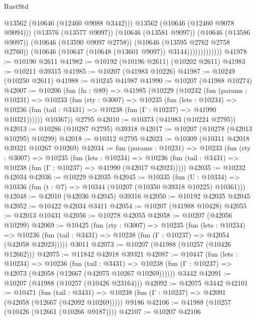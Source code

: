 \begin{lexlean}{RustStd}
\begin{coremodule}
                              @13562
                              (@10646 (@12460 @9088 @3442)))
                            @13562
                            (@10646 (@12460 @9078 @9094)))
                          (@13576 (@13577 @9097))
                          (@10646 (@13581 @9097))
                          (@10646 (@13586 @9097))
                          (@10646 (@13590 @9097 @2758))
                          (@10646 (@13595 @2762 @2758 @2760))
                          (@10646 (@10647 (@10648 (@13601 @9097)) @3144)))))))))))))
@41978 := @10190 @2611
@41982 := @10192 (@10196 @2611) (@10202 @2611)
@41983 := @10211 @39315
@41985 := @10207 (@41983 @10226)
@41987 := @10249 (@10250 @2611)
@41988 := @10245 @41987
@41990 := @10207 (@41988 @10274)
@42007 := @10206
    (fun (fn : @89) =>
    @41985
      (@10229
        (@10232
          (fun (params : @10231) =>
          @10233
            (fun (rty : @3007) =>
            @10235
              (fun (lets : @10234) =>
              @10236 (fun (tail : @3431) => @10238 (fun (Γ : @10237) => @41990 @10321))))))
        @10367))
    @2795
@42010 := @10373 (@41983 (@10224 @2795))
@42013 := @10286 (@10287 @2795) @39318
@42017 := @10207 (@10278 (@42013 @10295) @10299)
@42018 := @10312 @2795
@42023 := @10309 (@10311 @42018 @39321 @10267 @10269)
@42034 := fun (params : @10231) =>
  @10233
    (fun (rty : @3007) =>
    @10235
      (fun (lets : @10234) =>
      @10236 (fun (tail : @3431) => @10238 (fun (Γ : @10237) => @41990 (@42017 @42023)))))
@42035 := @10232 @42034
@42036 := @10229 @42035
@42045 := @10335
    (fun (U : @10334) => @10336 (fun (t : @7) => @10344 (@10207 (@10350 @39318 @10225) @10361)))
@42048 := @42010 (@42036 @42045) @39316
@42050 := @10192 @42035 @42045
@42052 := @10422 @42034 @3411
@42054 := @10207 (@41988 @10428)
@42055 := @42013 @10431
@42056 := @10278 @42055
@42058 := @10207 (@42056 @10299)
@42069 := @10425
    (fun (rty : @3007) =>
    @10235
      (fun (lets : @10234) =>
      @10236 (fun (tail : @3431) => @10238 (fun (Γ : @10237) => @42054 (@42058 @42023)))))
    @3011
@42073 := @10207 (@41988 (@10257 (@10426 @12662)))
@42075 := @11842 @42018 @39321
@42087 := @10447
    (fun (lets : @10234) =>
    @10236
      (fun (tail : @3431) =>
      @10238 (fun (Γ : @10237) => @42073 (@42058 (@12667 (@42075 @10267 @10269))))))
    @3442
@42091 := @10207 (@41988 (@10257 (@10426 @23164)))
@42092 := @42075 @3442
@42101 := @10471
    (fun (tail : @3431) => @10238 (fun (Γ : @10237) => @42091 (@42058 (@12667 (@42092 @10269)))))
    @9186
@42106 := @41988 (@10257 (@10426 (@12661 (@10266 @9187))))
@42107 := @10207 @42106

\end{coremodule}
\end{lexlean}
